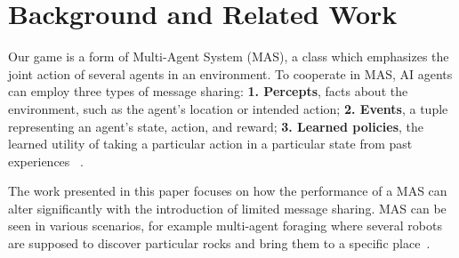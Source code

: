 \section{Background and Related Work}
Our game is a form of Multi-Agent System (MAS), a class which emphasizes the joint action of several agents in an environment. To cooperate in MAS, AI agents can employ three types of message sharing: {\bf{1. Percepts}}, facts about the environment, such as the agent's location or intended action; {\bf{2. Events}}, a tuple representing an agent's state, action, and reward; {\bf{3. Learned policies}}, the learned utility of taking a particular action in a particular state from past experiences ~\cite{Tan93IndepVsCoop}. 

The work presented in this paper focuses on how the performance of a MAS can alter significantly with the introduction of limited message sharing. MAS can be seen in various scenarios, for example multi-agent foraging where several robots are supposed to discover particular rocks and bring them to a specific place~\cite{Panait05CooperativeMultiAgent}.




